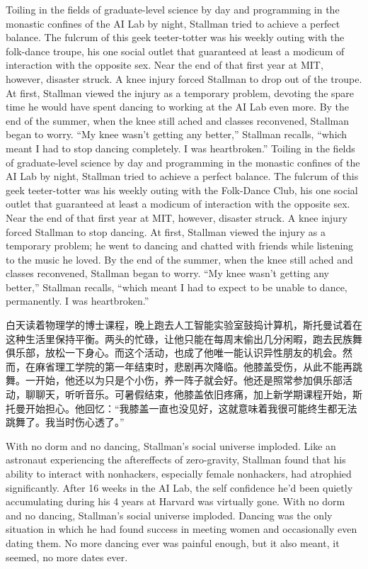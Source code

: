 \ifdefined\eng
\ifdefined\vone
Toiling in the fields of graduate-level science by day and programming in the monastic confines of the AI Lab by night, Stallman tried to achieve a perfect balance. The fulcrum of this geek teeter-totter was his weekly outing with the folk-dance troupe, his one social outlet that guaranteed at least a modicum of interaction with the opposite sex. Near the end of that first year at MIT, however, disaster struck. A knee injury forced Stallman to drop out of the troupe. At first, Stallman viewed the injury as a temporary problem, devoting the spare time he would have spent dancing to working at the AI Lab even more. By the end of the summer, when the knee still ached and classes reconvened, Stallman began to worry. ``My knee wasn't getting any better,'' Stallman recalls, ``which meant I had to stop dancing completely. I was heartbroken.''
\fi
\ifdefined\vtwo
Toiling in the fields of graduate-level science by day and programming in the monastic confines of the AI Lab by night, Stallman tried to achieve a perfect balance. The fulcrum of this geek teeter-totter was his weekly outing with the Folk-Dance Club, his one social outlet that guaranteed at least a modicum of interaction with the opposite sex. Near the end of that first year at MIT, however, disaster struck. A knee injury forced Stallman to stop dancing. At first, Stallman viewed the injury as a temporary problem; he went to dancing and chatted with friends while listening to the music he loved. By the end of the summer, when the knee still ached and classes reconvened, Stallman began to worry. ``My knee wasn't getting any better,'' Stallman recalls, ``which meant I had to expect to be unable to dance, permanently. I was heartbroken.''
\fi
\fi

\ifdefined\chs
白天读着物理学的博士课程，晚上跑去人工智能实验室鼓捣计算机，斯托曼试着在这种生活里保持平衡。两头的忙碌，让他只能在每周末偷出几分闲暇，跑去民族舞俱乐部，放松一下身心。而这个活动，也成了他唯一能认识异性朋友的机会。然而，在麻省理工学院的第一年结束时，悲剧再次降临。他膝盖受伤，从此不能再跳舞。一开始，他还以为只是个小伤，养一阵子就会好。他还是照常参加俱乐部活动，聊聊天，听听音乐。可暑假结束，他膝盖依旧疼痛，加上新学期课程开始，斯托曼开始担心。他回忆：``我膝盖一直也没见好，这就意味着我很可能终生都无法跳舞了。我当时伤心透了。''
\fi

\ifdefined\eng
\ifdefined\vone
With no dorm and no dancing, Stallman's social universe imploded. Like an astronaut experiencing the aftereffects of zero-gravity, Stallman found that his ability to interact with nonhackers, especially female nonhackers, had atrophied significantly. After 16 weeks in the AI Lab, the self confidence he'd been quietly accumulating during his 4 years at Harvard was virtually gone.
\fi
\ifdefined\vtwo
With no dorm and no dancing, Stallman's social universe imploded. Dancing was the only situation in which he had found success in meeting women and occasionally even dating them. No more dancing ever was painful enough, but it also meant, it seemed, no more dates ever.
\fi
\fi

